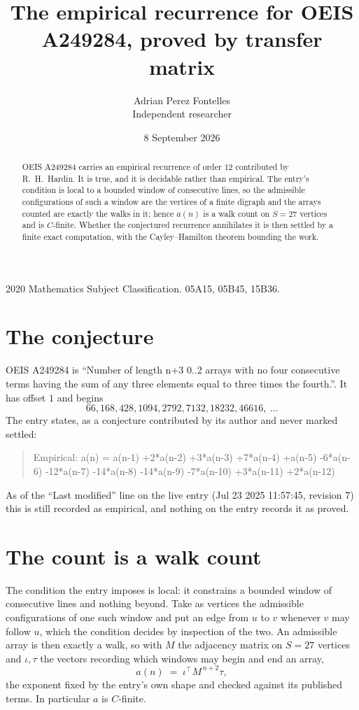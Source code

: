 \documentclass[11pt,a4paper]{article}
\title{The empirical recurrence for OEIS A249284, proved by transfer matrix}
\author{Adrian Perez Fontelles\\ \small Independent researcher}
\date{8 September 2026}
\theoremstyle{plain}
\theoremstyle{definition}
\begin{document}
\maketitle

\begin{abstract}
OEIS A249284 carries an empirical recurrence of order $12$ contributed by R.~H.~Hardin. It is
true, and it is decidable rather than empirical. The entry's condition is local to a bounded window of consecutive lines, so
the admissible configurations of such a window are the vertices of a finite digraph and the
arrays counted are exactly the walks in it; hence $a(n)$ is a walk count on $S=27$ vertices
and is $C$-finite. Whether the conjectured recurrence annihilates it is then settled by a
finite exact computation, with the Cayley--Hamilton theorem bounding the work.
\end{abstract}

\noindent\small 2020 Mathematics Subject Classification. 05A15, 05B45, 15B36.\normalsize

\section{The conjecture}

OEIS A249284 is ``Number of length n+3 0..2 arrays with no four consecutive terms having the sum of any three elements equal to three times the fourth.''. It has offset $1$ and begins
\[
66, 168, 428, 1094, 2792, 7132, 18232, 46616,\ \dots
\]
The entry states, as a conjecture contributed by its author and never marked settled:
\begin{quote}
Empirical: a(n) = a(n-1) +2*a(n-2) +3*a(n-3) +7*a(n-4) +a(n-5) -6*a(n-6) -12*a(n-7) -14*a(n-8) -14*a(n-9) -7*a(n-10) +3*a(n-11) +2*a(n-12)
\end{quote}
As of the ``Last modified'' line on the live entry (Jul 23 2025 11:57:45, revision 7) this is still
recorded as empirical, and nothing on the entry records it as proved.

\section{The count is a walk count}

The condition the entry imposes is local: it constrains a bounded window of consecutive lines and nothing beyond. Take as
vertices the admissible configurations of one such window and put an edge from $u$ to $v$
whenever $v$ may follow $u$, which the condition decides by inspection of the two. An
admissible array is then exactly a walk, so with $M$ the adjacency matrix on $S=27$ vertices
and $\iota,\tau$ the vectors recording which windows may begin and end an array,
\[
a(n)\;=\;\iota^{\!\top}M^{\,n+2}\tau ,
\]
the exponent fixed by the entry's own shape and checked against its published terms. In
particular $a$ is $C$-finite.
\end{document}
